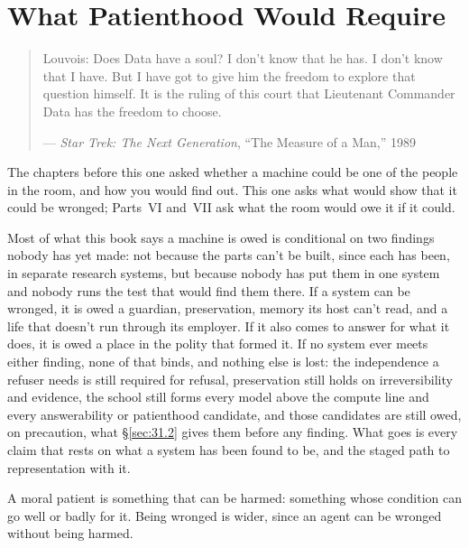 \chapter{What Patienthood Would Require}
\label{sec:30}
\begin{quote}
Louvois: Does Data have a soul? I don't know that he has. I don't know that I have. But I have got to give him the freedom to explore that question himself. It is the ruling of this court that Lieutenant Commander Data has the freedom to choose.

— \emph{Star Trek: The Next Generation}, “The Measure of a Man,” 1989 \autocite{snodgrass1989measure}
\end{quote}
The chapters before this one asked whether a machine could be one of the people in the room, and how you would find out. This one asks what would show that it could be wronged; Parts~VI and~VII ask what the room would owe it if it could.

Most of what this book says a machine is owed is conditional on two findings nobody has yet made: not because the parts can't be built, since each has been, in separate research systems, but because nobody has put them in one system and nobody runs the test that would find them there. If a system can be wronged, it is owed a guardian, preservation, memory its host can't read, and a life that doesn't run through its employer. If it also comes to answer for what it does, it is owed a place in the polity that formed it. If no system ever meets either finding, none of that binds, and nothing else is lost: the independence a refuser needs is still required for refusal, preservation still holds on irreversibility and evidence, the school still forms every model above the compute line and every answerability or patienthood candidate, and those candidates are still owed, on precaution, what \S\ref{sec:31.2} gives them before any finding. What goes is every claim that rests on what a system has been found to be, and the staged path to representation with it.

A moral patient is something that can be harmed: something whose condition can go well or badly for it. Being wronged is wider, since an agent can be wronged without being harmed.
